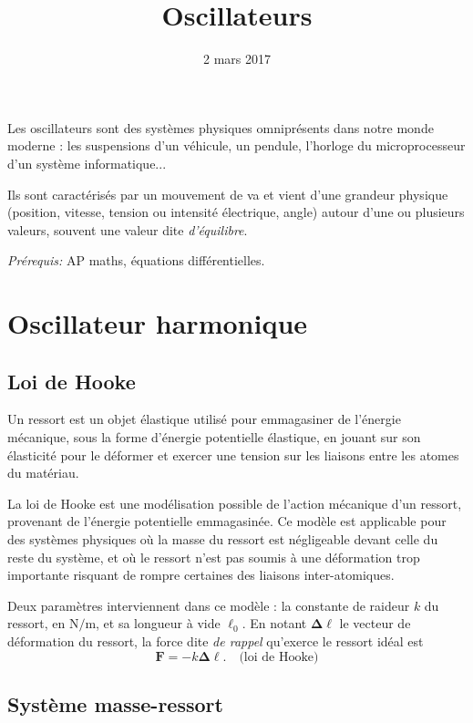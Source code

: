 \documentclass{article}
\title{Oscillateurs}
\author{}
\date{2 mars 2017}
\renewcommand{\vec}[1]{\boldsymbol{\mathbf{#1}}}
\theoremstyle{definition}
\begin{document}
\maketitle

    Les oscillateurs sont des systèmes physiques omniprésents dans notre monde moderne : les suspensions d'un véhicule, un pendule, l'horloge du microprocesseur d'un système informatique...

    Ils sont caractérisés par un mouvement de va et vient d'une grandeur physique (position, vitesse, tension ou intensité électrique, angle) autour d'une ou plusieurs valeurs, souvent une valeur dite \textit{d'équilibre}.

\noindent\textit{Prérequis:} AP maths, équations différentielles.

\section{Oscillateur harmonique}

\subsection{Loi de Hooke}

Un ressort est un objet élastique utilisé pour emmagasiner de l'énergie mécanique, sous la forme d'énergie potentielle élastique, en jouant sur son élasticité pour le déformer et exercer une tension sur les liaisons entre les atomes du matériau.

La loi de Hooke est une modélisation possible de l'action mécanique d'un ressort, provenant de l'énergie potentielle emmagasinée. Ce modèle est applicable pour des systèmes physiques où la masse du ressort est négligeable devant celle du reste du système, et où le ressort n'est pas soumis à une déformation trop importante risquant de rompre certaines des liaisons inter-atomiques.

Deux paramètres interviennent dans ce modèle : la constante de raideur $k$ du ressort, en $\si{\newton\per\metre} $, et sa longueur à vide $\ell_0$. En notant $\vec{\Delta\ell}$ le vecteur de déformation du ressort, la force dite \textit{de rappel} qu'exerce le ressort idéal est
	\[
    \vec{F} = -k\vec{\Delta\ell}. \quad \text{(loi de Hooke)}
    \]

\subsection{Système masse-ressort}
\end{document}

